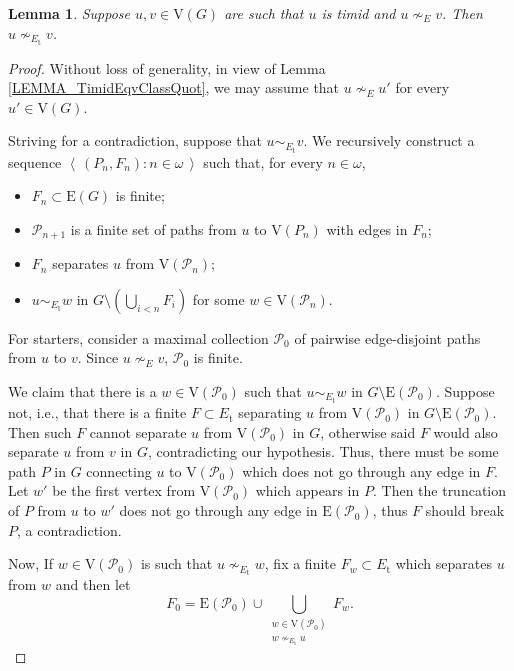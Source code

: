 \documentclass[10pt]{article}
\numberwithin{equation}{subsection}
\newtheorem{lemma}[equation]{Lemma}
\theoremstyle{remark}
\newcommand{\seq}[1]{{\left\langle \, {#1} \,\right\rangle}}
\begin{document}
\begin{lemma}\label{LEMMA_TimidEdgeSeparation}
    Suppose $u,v\in \mathrm{V}(G)$ are such that $u$ is timid and $u\nsim_E v$. Then $u\nsim_{E_\mathrm{t}} v$.
\end{lemma}
\begin{proof}
    Without loss of generality, in view of Lemma \ref{LEMMA_TimidEqvClassQuot}, we may assume that $u\nsim_E u'$ for every $u'\in \mathrm{V}(G)$.

    Striving for a contradiction, suppose that $u\sim_{E_\mathrm{t}}v$. We recursively construct a sequence $\seq{(P_n,F_n):{n\in\omega}}$ such that, for every $n\in\omega$, 
    \begin{itemize}
        \item[(i)] $F_n\subset \mathrm{E}(G)$ is finite;
        \item[(ii)] $\mathcal P_{n+1}$ is a finite set of paths from $u$ to $\mathrm{V}(P_n)$ with edges in $F_n$;
        \item[(iii)] $F_{n}$ separates $u$ from $\mathrm{V}(\mathcal P_n)$; 
        \item[(iv)] $u\sim_{E_\mathrm{t}} w$ in $G\setminus \left(\bigcup_{i< n}F_i\right)$ for some $w\in \mathrm{V}(\mathcal P_n)$. 
    \end{itemize}
    
    For starters, consider a maximal collection $\mathcal P_0$ of pairwise edge-disjoint paths from $u$ to $v$. Since $u\nsim_E v$, $\mathcal P_0$ is finite. 
    
    We claim that there is a $w\in \mathrm{V}(\mathcal P_0)$ such that $u\sim_{E_\mathrm{t}} w$ in $G\setminus \mathrm{E}(\mathcal P_0)$. Suppose not, i.e., that there is a finite $F\subset E_\mathrm{t}$ separating $u$ from $\mathrm{V}(\mathcal P_0)$ in $G\setminus \mathrm{E}(\mathcal P_0)$. Then such $F$ cannot separate $u$ from $\mathrm{V}(\mathcal P_0)$ in $G$, otherwise said $F$ would also separate $u$ from $v$ in $G$, contradicting our hypothesis. Thus, there must be some path $P$ in $G$ connecting $u$ to $\mathrm{V}(\mathcal P_0)$ which does not go through any edge in $F$. Let $w'$ be the first vertex from $\mathrm{V}(\mathcal P_0)$ which appears in $P$. Then the truncation of $P$ from $u$ to $w'$ does not go through any edge in $\mathrm{E}(\mathcal P_0)$, thus $F$ should break $P$, a contradiction. 
    
    Now, If $w\in \mathrm{V}(\mathcal P_0)$ is such that $u\nsim_{E_\mathrm{t}}w$, fix a finite $F_w\subset E_\mathrm{t}$ which separates $u$ from $w$ and then let
    \[
      F_0 = \mathrm{E}(\mathcal P_0)\cup \bigcup_{\substack{w\in \mathrm{V}(\mathcal P_0)\\w\nsim_{E_\mathrm{t}}u}}F_w.
    \]


\end{proof}
\end{document}
